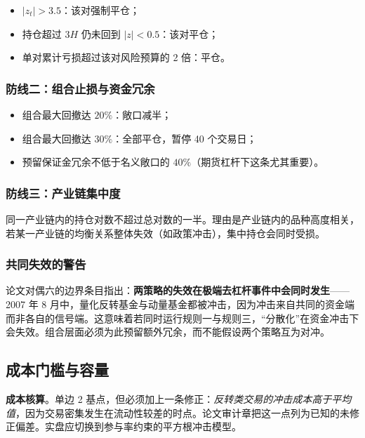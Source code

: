 \begin{itemize}[leftmargin=2.2em]
  \item $|z_t|>3.5$：该对强制平仓；
  \item 持仓超过 $3H$ 仍未回到 $|z|<0.5$：该对平仓；
  \item 单对累计亏损超过该对风险预算的 2 倍：平仓。
\end{itemize}

\subsubsection*{防线二：组合止损与资金冗余}

\begin{itemize}[leftmargin=2.2em]
  \item 组合最大回撤达 $20\%$：敞口减半；
  \item 组合最大回撤达 $30\%$：全部平仓，暂停 40 个交易日；
  \item 预留保证金冗余不低于名义敞口的 $40\%$（期货杠杆下这条尤其重要）。
\end{itemize}

\subsubsection*{防线三：产业链集中度}

同一产业链内的持仓对数不超过总对数的一半。理由是产业链内的品种高度相关，若某一产业链的均衡关系整体失效（如政策冲击），集中持仓会同时受损。

\subsubsection*{共同失效的警告}

论文对偶六的边界条目指出：\textbf{两策略的失效在极端去杠杆事件中会同时发生}——2007 年 8 月中，量化反转基金与动量基金都被冲击，因为冲击来自共同的资金端而非各自的信号端\cite{khandanilo2011,brunnermeier2009}。这意味着若同时运行规则一与规则三，“分散化”在资金冲击下会失效。组合层面必须为此预留额外冗余，而不能假设两个策略互为对冲。

\subsection{成本门槛与容量}

\textbf{成本核算}。单边 2 基点，但必须加上一条修正：\emph{反转类交易的冲击成本高于平均值}，因为交易密集发生在流动性较差的时点。论文审计章把这一点列为已知的未修正偏差。实盘应切换到参与率约束的平方根冲击模型。

